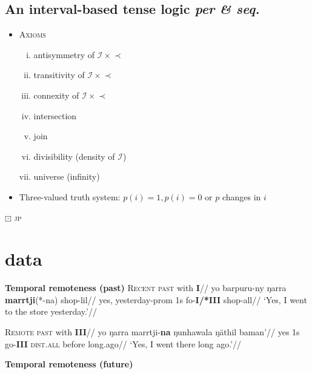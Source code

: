 \documentclass[11pt,dvipsnames]{article}
\newcommand{\gls}{\textsc}
\begin{document}
\subsection*{An interval-based tense logic \textit{per} \citet{Hamblin1971} \textit{\& seq.}}
\begin{itemize}
	\item \textsc{Axioms}

		\begin{enumerate}[i.]
			\item antisymmetry of $\mathcal I\times\!\prec$
			\item transitivity of $\mathcal I\times\!\prec$
			\item connexity of $\mathcal I\times\!\prec$
			\item intersection
			\item join
			\item divisibility (density of $\mathcal I$)
			\item universe (infinity)
			
		\end{enumerate}
		
 \item  Three-valued truth system: $p(i)=1,p(i)=0$ or $p$ changes in $i$

\end{itemize}



\vfill\hspace*{\fill}\scriptsize$\boxdot$ \textsc{jp}

\normalsize



\newpage
\section*{data}
\small


\pex \textbf{Temporal remoteness (past)}
\a{}\begingl\glpreamble\textsc{Recent past} with \textbf{I}//
\gla yo barpuru-ny ŋarra \textbf{marrtji}(*-na) shop-lil//
\glb yes, yesterday{\sc-prom} 1s fo-\textbf{I/*III} shop-{\sc all}//
\glft`Yes, I went to the store yesterday.'//\endgl


\a
{}\begingl\glpreamble\textsc{Remote past} with \textbf{III}//
\gla yo ŋarra marrtji-\textbf{na} ŋunhawala ŋäthil baman'//
\glb yes 1s go-\textbf{III} \gls{dist.all} before long.ago//
\glft`Yes, I went there long ago.'//
\endgl
\xe

\pex{}\textbf{Temporal remoteness (future)}
\end{document}
